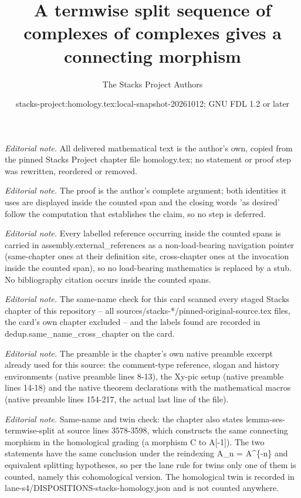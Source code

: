 \documentclass[10pt,a4paper]{amsart}
\title{A termwise split sequence of complexes of complexes gives a connecting morphism}
\author{The Stacks Project Authors}
\date{stacks-project:homology.tex:local-snapshot-20261012; GNU FDL 1.2 or later}
\theoremstyle{plain}
\theoremstyle{definition}
\theoremstyle{remark}
\numberwithin{equation}{subsection}
\begin{document}
\maketitle
\noindent\textit{Editorial note.} All delivered mathematical text is the author's own, copied from the pinned Stacks Project chapter file homology.tex; no statement or proof step was rewritten, reordered or removed.\par\medskip
\noindent\textit{Editorial note.} The proof is the author's complete argument; both identities it uses are displayed inside the counted span and the closing words 'as desired' follow the computation that establishes the claim, so no step is deferred.\par\medskip
\noindent\textit{Editorial note.} Every labelled reference occurring inside the counted spans is carried in assembly.external\_references as a non-load-bearing navigation pointer (same-chapter ones at their definition site, cross-chapter ones at the invocation inside the counted span), so no load-bearing mathematics is replaced by a stub. No bibliography citation occurs inside the counted spans.\par\medskip
\noindent\textit{Editorial note.} The same-name check for this card scanned every staged Stacks chapter of this repository -- all sources/stacks-*/pinned-original-source.tex files, the card's own chapter excluded -- and the labels found are recorded in dedup.same\_name\_cross\_chapter on the card.\par\medskip
\noindent\textit{Editorial note.} The preamble is the chapter's own native preamble excerpt already used for this source: the comment-type reference, slogan and history environments (native preamble lines 8-13), the Xy-pic setup (native preamble lines 14-18) and the native theorem declarations with the mathematical macros (native preamble lines 154-217, the actual last line of the file).\par\medskip
\noindent\textit{Editorial note.} Same-name and twin check: the chapter also states lemma-ses-termwise-split at source lines 3578-3598, which constructs the same connecting morphism in the homological grading (a morphism C to A[-1]). The two statements have the same conclusion under the reindexing A\_n = A\textasciicircum{}\{-n\} and equivalent splitting hypotheses, so per the lane rule for twins only one of them is counted, namely this cohomological version. The homological twin is recorded in lane-s4/DISPOSITIONS-stacks-homology.json and is not counted anywhere.\par\medskip
\end{document}
